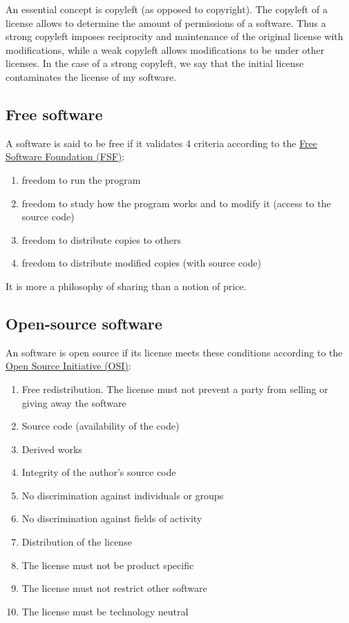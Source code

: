 \documentclass[12pt, colorinlistoftodos]{article}
\begin{document}
An essential concept is copyleft (as opposed to copyright). 
The copyleft of a license allows to determine the amount of permissions of a software.
Thus a strong copyleft imposes reciprocity and maintenance of the original license with modifications, 
while a weak copyleft allows modifications to be under other licenses.
In the case of a strong copyleft, we say that the initial license contaminates the license of my software.

\subsection*{Free software}

A software is said to be free if it validates 4 criteria according to 
the \href{https://www.gnu.org/philosophy/free-sw.html#four-freedoms}{Free Software Foundation (FSF)}:

\begin{enumerate}
    \item freedom to run the program
    \item freedom to study how the program works and to modify it (access to the source code)
    \item freedom to distribute copies to others
    \item freedom to distribute modified copies (with source code)
\end{enumerate}

It is more a philosophy of sharing than a notion of price.

\subsection*{Open-source software}

An software is open source if its license meets these conditions according 
to the \href{https://opensource.org/docs/osd}{Open Source Initiative (OSI)}:

\begin{enumerate}
    \item Free redistribution. The license must not prevent a party from selling or giving away the software
    \item Source code (availability of the code)
    \item Derived works
    \item Integrity of the author's source code
    \item No discrimination against individuals or groups
    \item No discrimination against fields of activity
    \item Distribution of the license
    \item The license must not be product specific
    \item The license must not restrict other software
    \item The license must be technology neutral
\end{enumerate}
\end{document}
